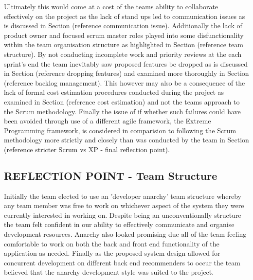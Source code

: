 \documentclass{l3proj}
\begin{document}
Ultimately this would come at a cost of the teams ability to collaborate effectively on the project as the lack of stand ups led to communication issues as is discussed in Section (reference communication issue). Additionally the lack of product owner and focused scrum master roles played into some disfunctionality within the team organisation structure as highlighted in Section (reference team structure). By not conducting incomplete work and priority reviews at the each sprint's end the team inevitably saw proposed features be dropped as is discussed in Section (reference dropping features) and examined more thoroughly in Section (reference backlog management). This however may also be a consequence of the lack of formal cost estimation procedures conducted during the project as examined in Section (reference cost estimation) and not the teams approach to the Scrum methodology. Finally the issue of if whether such failures could have been avoided through use of a different agile framework, the Extreme Programming framework, is considered in comparision to following the Scrum methodology more strictly and closely than was conducted by the team in Section (reference stricter Scrum vs XP - final reflection point).


\subsection{REFLECTION POINT - Team Structure}
\label{sec:teamstructure}
%




Initially the team elected to use an 'developer anarchy' team structure whereby any team member was free to work on whichever aspect of the system they were currently interested in working on. Despite being an unconventionally structure the team felt confident in our ability to effectively communicate and organise development resources. Anarchy also looked promising due all of the team feeling comfortable to work on both the back and front end functionality of the application as needed. Finally as the proposed system design allowed for concurrent development on different back end recommenders to occur the team believed that the anarchy development style was suited to the project.
\end{document}
